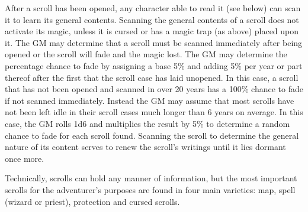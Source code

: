 \begin{multicols}{2}
After a scroll has been opened, any character able to read it (see below) can scan it to learn its general contents.  Scanning the general contents of a scroll does not activate its magic, unless it is cursed or has a magic trap (as above) placed upon it.  The GM may determine that a scroll must be scanned immediately after being opened or the scroll will fade and the magic lost.  The GM may determine the percentage chance to fade by assigning a base 5\% and adding 5\% per year or part thereof after the first that the scroll case has laid unopened.  In this case, a scroll that has not been opened and scanned in over 20 years has a 100\% chance to fade if not scanned immediately.  Instead the GM may assume that most scrolls have not been left idle in their scroll cases much longer than 6 years on average.  In this case, the GM rolls 1d6 and multiplies the result by 5\% to determine a random chance to fade for each scroll found.  Scanning the scroll to determine the general nature of its content serves to renew the scroll's writings until it lies dormant once more.

Technically, scrolls can hold any manner of information, but the most important scrolls for the adventurer's purposes are found in four main varieties: map, spell (wizard or priest), protection and cursed scrolls.  

\noindent
\begin{minipage}{\columnwidth}


\end{minipage}
\end{multicols}
